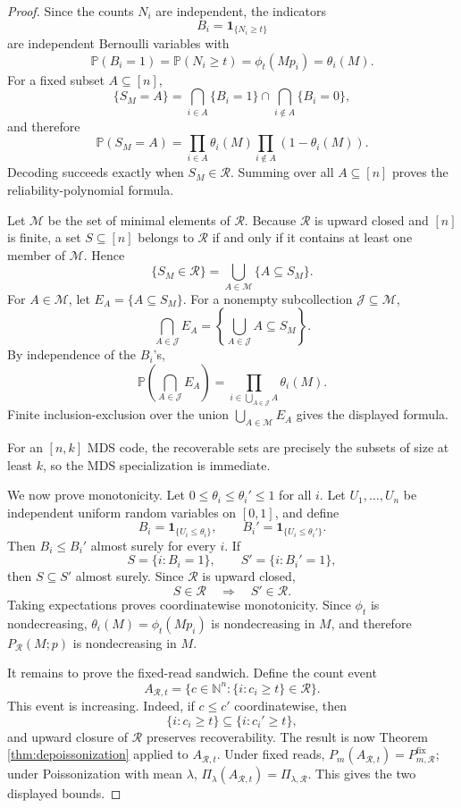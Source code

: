 \documentclass[11pt]{article}
\theoremstyle{definition}
\theoremstyle{remark}
\newcommand{\Pbb}{\mathbb P}
\newcommand{\N}{\mathbb N}
\newcommand{\1}{\mathbf 1}
\begin{document}
\begin{proof}
Since the counts \(N_i\) are independent, the indicators
\[
  B_i=\1_{\{N_i\ge t\}}
\]
are independent Bernoulli variables with
\[
  \Pbb(B_i=1)=\Pbb(N_i\ge t)=\phi_t(Mp_i)=\theta_i(M).
\]
For a fixed subset \(A\subseteq[n]\),
\[
  \{S_M=A\}=\bigcap_{i\in A}\{B_i=1\}
  \cap\bigcap_{i\notin A}\{B_i=0\},
\]
and therefore
\[
  \Pbb(S_M=A)=
  \prod_{i\in A}\theta_i(M)\prod_{i\notin A}(1-\theta_i(M)).
\]
Decoding succeeds exactly when \(S_M\in\mathcal R\).  Summing over all \(A\subseteq[n]\) proves the reliability-polynomial formula.

Let \(\mathcal M\) be the set of minimal elements of \(\mathcal R\).  Because \(\mathcal R\) is upward closed and \([n]\) is finite, a set \(S\subseteq[n]\) belongs to \(\mathcal R\) if and only if it contains at least one member of \(\mathcal M\).  Hence
\[
  \{S_M\in\mathcal R\}
  =\bigcup_{A\in\mathcal M}\{A\subseteq S_M\}.
\]
For \(A\in\mathcal M\), let \(E_A=\{A\subseteq S_M\}\).  For a nonempty subcollection \(\mathcal J\subseteq\mathcal M\),
\[
  \bigcap_{A\in\mathcal J}E_A
  =\left\{\bigcup_{A\in\mathcal J}A\subseteq S_M\right\}.
\]
By independence of the \(B_i\)'s,
\[
  \Pbb\left(\bigcap_{A\in\mathcal J}E_A\right)
  =\prod_{i\in\bigcup_{A\in\mathcal J}A}\theta_i(M).
\]
Finite inclusion-exclusion over the union \(\bigcup_{A\in\mathcal M}E_A\) gives the displayed formula.

For an \([n,k]\) MDS code, the recoverable sets are precisely the subsets of size at least \(k\), so the MDS specialization is immediate.

We now prove monotonicity.  Let \(0\le\theta_i\le\theta_i'\le1\) for all \(i\).  Let \(U_1,\ldots,U_n\) be independent uniform random variables on \([0,1]\), and define
\[
  B_i=\1_{\{U_i\le\theta_i\}},
  \qquad
  B_i'=\1_{\{U_i\le\theta_i'\}}.
\]
Then \(B_i\le B_i'\) almost surely for every \(i\).  If
\[
  S=\{i:B_i=1\},
  \qquad
  S'=\{i:B_i'=1\},
\]
then \(S\subseteq S'\) almost surely.  Since \(\mathcal R\) is upward closed,
\[
  S\in\mathcal R\quad\Longrightarrow\quad S'\in\mathcal R.
\]
Taking expectations proves coordinatewise monotonicity.  Since \(\phi_t\) is nondecreasing, \(\theta_i(M)=\phi_t(Mp_i)\) is nondecreasing in \(M\), and therefore \(P_{\mathcal R}(M;p)\) is nondecreasing in \(M\).

It remains to prove the fixed-read sandwich.  Define the count event
\[
  A_{\mathcal R,t}=\{c\in\N^n:\{i:c_i\ge t\}\in\mathcal R\}.
\]
This event is increasing.  Indeed, if \(c\le c'\) coordinatewise, then
\[
  \{i:c_i\ge t\}\subseteq\{i:c_i'\ge t\},
\]
and upward closure of \(\mathcal R\) preserves recoverability.  The result is now Theorem \ref{thm:depoissonization} applied to \(A_{\mathcal R,t}\).  Under fixed reads, \(P_m(A_{\mathcal R,t})=P_{m,\mathcal R}^{\mathrm{fix}}\); under Poissonization with mean \(\lambda\), \(\Pi_\lambda(A_{\mathcal R,t})=\Pi_{\lambda,\mathcal R}\).  This gives the two displayed bounds.
\end{proof}
\end{document}
